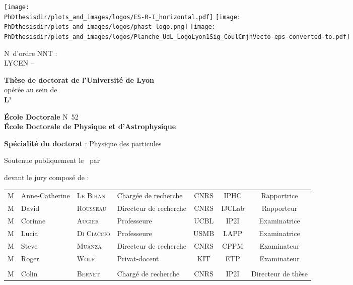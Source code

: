 \thispagestyle{empty}
\begin{center}
\large

\texttt{[image: \\PhDthesisdir/plots\_and\_images/logos/ES-R-I\_horizontal.pdf]}
\hfill
\texttt{[image: \\PhDthesisdir/plots\_and\_images/logos/phast-logo.png]}
\hfill
\texttt{[image: \\PhDthesisdir/plots\_and\_images/logos/Planche\_UdL\_LogoLyon1Sig\_CoulCmjnVecto-eps-converted-to.pdf]}

\begin{flushleft}
N\degree\ d'ordre NNT : \\
LYCEN -- 
\end{flushleft}

\vspace{5mm}

{\LARGE \textbf{Thèse de doctorat de l'Université de Lyon}}\\
opérée au sein de\\
\textbf{L'\insertinstitute}

\vspace{.75cm}

\textbf{École Doctorale} N\degree\ 52\\
\textbf{École Doctorale de Physique et d'Astrophysique}

\vspace{.75cm}

\textbf{Spécialité du doctorat} : Physique des particules

\vspace{1.25cm}

Soutenue publiquement le \insertdate\ par

\vspace{.75cm}

{\LARGE \textbf{\insertauthor}}

\vspace{1.25cm}

\textbf{\huge\inserttitle}

\vfill
devant le jury composé de :

\vspace{.25cm}

{\small

\begin{tabular}{llllccc}
M\up{me}\!\!\!\! & Anne-Catherine \!\! & \textsc{Le Bihan} & Chargée de recherche & CNRS & IPHC & Rapportrice\\
M & David & \textsc{Rousseau} & Directeur de recherche & CNRS & IJCLab & Rapporteur\\
M\up{me}\!\!\!\! & Corinne & \textsc{Augier} & Professeure & UCBL & IP2I & Examinatrice\\
M\up{me}\!\!\!\! & Lucia & \textsc{Di Ciaccio} & Professeure & USMB & LAPP & Examinatrice\\
M & Steve & \textsc{Muanza} & Directeur de recherche & CNRS & CPPM & Examinateur\\
M & Roger & \textsc{Wolf} & Privat-docent & KIT  & ETP & Examinateur\\
\\
M & Colin & \textsc{Bernet} & Chargé de recherche & CNRS & IP2I & Directeur de thèse \\
\end{tabular}

}
\end{center}
